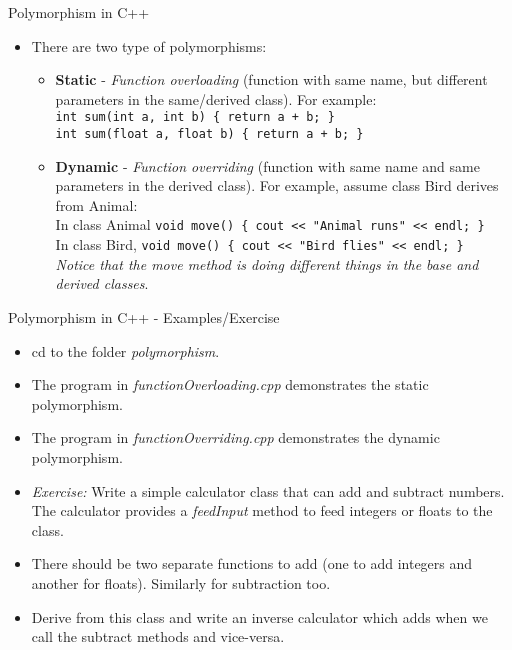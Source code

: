 \documentclass[aspectratio=169]{beamer}
\begin{document}
\begin{frame}[fragile]{Polymorphism in C++}
    \begin{itemize}
        \item There are two type of polymorphisms:
        \begin{itemize}
            \item \textbf{Static} - \textit{Function overloading} (function with same name, but different parameters in the same/derived class). For example:\\ \verb|int sum(int a, int b) { return a + b; }| \\ \verb|int sum(float a, float b) { return a + b; }|
            \item \textbf{Dynamic} - \textit{Function overriding} (function with same name and same parameters in the derived class). For example, assume class Bird derives from Animal: \\ In class Animal \verb|void move() { cout << "Animal runs" << endl; }| \\ In class Bird, \verb|void move() { cout << "Bird flies" << endl; }| \\ \textit{Notice that the move method is doing different things in the base and derived classes}.
        \end{itemize}
    \end{itemize}
\end{frame}

\begin{frame}[fragile]{Polymorphism in C++ - Examples/Exercise}
    \begin{itemize}
        \item cd to the folder \textit{polymorphism}.
        \item The program in \textit{functionOverloading.cpp} demonstrates the static polymorphism.
        \item The program in \textit{functionOverriding.cpp} demonstrates the dynamic polymorphism.
        \item \textit{Exercise:} Write a simple calculator class that can add and subtract numbers. The calculator provides a \textit{feedInput} method to feed integers or floats to the class.
        \item There should be two separate functions to add (one to add integers and another for floats). Similarly for subtraction too.
        \item Derive from this class and write an inverse calculator which adds when we call the subtract methods and vice-versa.
    \end{itemize}
\end{frame}
\end{document}

